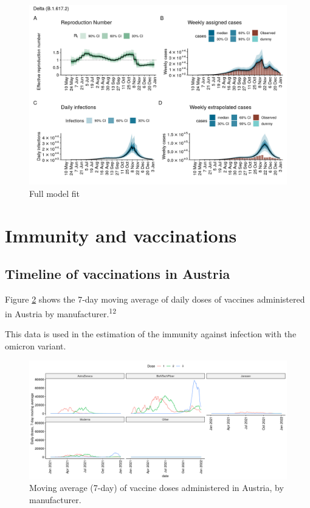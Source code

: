 \documentclass[
]{article}
\begin{document}
\begin{figure}

{\centering \includegraphics[width=0.8\linewidth]{omicron_austria_files/figure-latex/epidemia-full-delta-fit-1} 

}

\caption{Full model fit}\label{fig:epidemia-full-delta-fit}
\end{figure}

\hypertarget{immunity-and-vaccinations}{%
\section{Immunity and vaccinations}\label{immunity-and-vaccinations}}

\hypertarget{timeline-of-vaccinations-in-austria}{%
\subsection{Timeline of vaccinations in Austria}\label{timeline-of-vaccinations-in-austria}}

Figure \ref{fig:vaccine-doses-austria} shows the 7-day moving average of
daily doses of vaccines administered in Austria by manufacturer.\textsuperscript{12}

This data is used in the estimation of the immunity against infection
with the omicron variant.

\begin{figure}

{\centering \includegraphics[width=1\linewidth]{omicron_austria_files/figure-latex/vaccine-doses-austria-1} 

}

\caption{Moving average (7-day) of vaccine doses administered in Austria, by manufacturer.}\label{fig:vaccine-doses-austria}
\end{figure}
\end{document}
